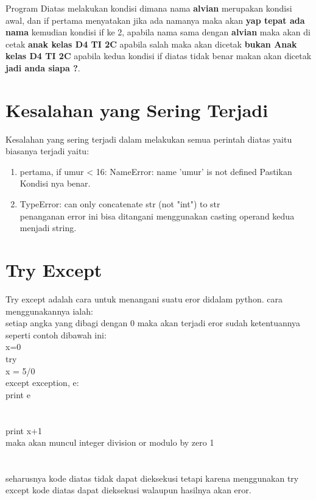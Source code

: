         Program Diatas melakukan kondisi dimana nama \textbf{alvian} merupakan kondisi awal, dan if pertama menyatakan jika ada namanya maka akan \textbf{yap tepat ada nama} kemudian kondisi if ke 2, apabila nama sama dengan \textbf{alvian} maka akan di cetak \textbf{anak kelas D4 TI 2C} apabila salah maka akan dicetak \textbf{bukan Anak kelas D4 TI 2C} apabila kedua kondisi if diatas tidak benar makan akan dicetak \textbf{jadi anda siapa ?}.
        
        \section{Kesalahan yang Sering Terjadi}
        Kesalahan yang sering terjadi dalam melakukan semua perintah diatas yaitu biasanya terjadi yaitu:
        
        \begin{enumerate}
        \item pertama,    if umur < 16:
        NameError: name 'umur' is not defined 
        Pastikan Kondisi nya benar.
        \item TypeError: can only concatenate str (not "int") to str\\
    	penanganan error ini bisa ditangani menggunakan casting operand kedua menjadi string.
    	\end{enumerate}
        \section{Try Except}
        Try except adalah cara untuk menangani suatu eror didalam python. cara menggunakannya ialah:\\
        setiap angka yang dibagi dengan 0 maka akan terjadi eror sudah ketentuannya seperti contoh dibawah ini:\\
x=0\\
try\\
x = 5/0\\

except exception, e:\\
print e\\
\\
\\
print x+1\\
maka akan muncul integer division or modulo by zero 1\\
\\
\\
seharusnya kode diatas tidak dapat dieksekusi tetapi karena menggunakan try except kode diatas dapat dieksekusi walaupun hasilnya akan eror.

